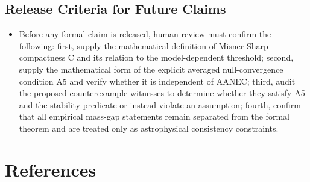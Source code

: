 \documentclass[conference]{IEEEtran}
\begin{document}
\subsection{Release Criteria for Future Claims}
\begin{itemize}
\item Before any formal claim is released, human review must confirm the following: first, supply the mathematical definition of Misner-Sharp compactness C and its relation to the model-dependent threshold; second, supply the mathematical form of the explicit averaged null-convergence condition A5 and verify whether it is independent of AANEC; third, audit the proposed counterexample witnesses to determine whether they satisfy A5 and the stability predicate or instead violate an assumption; fourth, confirm that all empirical mass-gap statements remain separated from the formal theorem and are treated only as astrophysical consistency constraints.
\end{itemize}\section*{References}
\nocite{cite_07d6df5d6978a1fc,cite_0ed84243cf171bc4,cite_1e54e3c2b35110ad,cite_2576833bf7ef143a,cite_283d00782f1f9ecb,cite_357dd780a9e3a378,cite_364386a3569b6e66,cite_37ecbded9d629353,cite_42e341ff6471ce89,cite_572fec0a1e5d74d9,cite_5ea4dc0e1b288757,cite_63476e0b002da386,cite_72d7ff391b29c495,cite_789b47fb0241d9ae,cite_7a407c865faafd11,cite_7a44e6730c44cb39,cite_7ae92f06684c60ef,cite_977568cf7b8a55bf,cite_98c5e596c0c34b68,cite_bfae3a92efd1d48f,cite_c369df652181e8f7,cite_cbbced417410bc6c,cite_cc5bc07a219047b4,cite_d3016ce6d1faa8ec,cite_e228b5fd31e37646,cite_e7b42f305bc08498,cite_ecea60a2300e4892,cite_f634820e22d7a238,cite_fd0f77b2a173c0ab}


\end{document}
